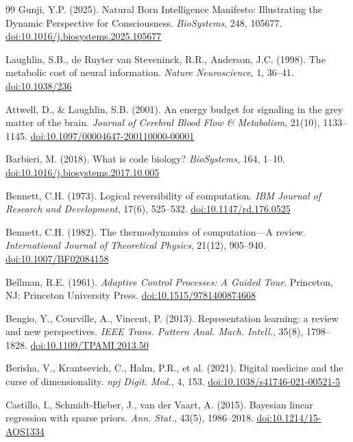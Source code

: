 \documentclass[12pt]{article}
\begin{document}
\begin{thebibliography}{99}
Gunji, Y.P. (2025). Natural Born Intelligence Manifesto: Illustrating the Dynamic Perspective for Consciousness. \textit{BioSystems}, 248, 105677. \href{https://doi.org/10.1016/j.biosystems.2025.105677}{doi:10.1016/j.biosystems.2025.105677}

Laughlin, S.B., de Ruyter van Steveninck, R.R., Anderson, J.C. (1998). The metabolic cost of neural information. \textit{Nature Neuroscience}, 1, 36--41. \href{https://doi.org/10.1038/236}{doi:10.1038/236}

Attwell, D., \& Laughlin, S.B. (2001). An energy budget for signaling in the grey matter of the brain. \textit{Journal of Cerebral Blood Flow \& Metabolism}, 21(10), 1133--1145. \href{https://doi.org/10.1097/00004647-200110000-00001}{doi:10.1097/00004647-200110000-00001}

Barbieri, M. (2018). What is code biology? \textit{BioSystems}, 164, 1--10. \href{https://doi.org/10.1016/j.biosystems.2017.10.005}{doi:10.1016/j.biosystems.2017.10.005}

Bennett, C.H. (1973). Logical reversibility of computation. \textit{IBM Journal of Research and Development}, 17(6), 525--532. \href{https://doi.org/10.1147/rd.176.0525}{doi:10.1147/rd.176.0525}

Bennett, C.H. (1982). The thermodynamics of computation—A review. \textit{International Journal of Theoretical Physics}, 21(12), 905--940. \href{https://doi.org/10.1007/BF02084158}{doi:10.1007/BF02084158}

Bellman, R.E. (1961). \textit{Adaptive Control Processes: A Guided Tour}. Princeton, NJ: Princeton University Press. \href{https://doi.org/10.1515/9781400874668}{doi:10.1515/9781400874668}

Bengio, Y., Courville, A., Vincent, P. (2013). Representation learning: a review and new perspectives. \textit{IEEE Trans. Pattern Anal. Mach. Intell.}, 35(8), 1798--1828. \href{https://doi.org/10.1109/TPAMI.2013.50}{doi:10.1109/TPAMI.2013.50}

Berisha, V., Krantsevich, C., Hahn, P.R., et al. (2021). Digital medicine and the curse of dimensionality. \textit{npj Digit. Med.}, 4, 153. \href{https://doi.org/10.1038/s41746-021-00521-5}{doi:10.1038/s41746-021-00521-5}

Castillo, I., Schmidt-Hieber, J., van der Vaart, A. (2015). Bayesian linear regression with sparse priors. \textit{Ann. Stat.}, 43(5), 1986--2018. \href{https://doi.org/10.1214/15-AOS1334}{doi:10.1214/15-AOS1334}


\end{thebibliography}
\end{document}

